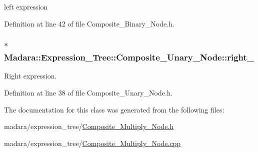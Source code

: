 left expression 



Definition at line 42 of file Composite\_\-Binary\_\-Node.h.

\hypertarget{classMadara_1_1Expression__Tree_1_1Composite__Unary__Node_a077b7bd1b52df6f5c6adfde735556a68}{
\subsubsection[{right\_\-}]{$\ast$ {\bf Madara::Expression\_\-Tree::Composite\_\-Unary\_\-Node::right\_\-}}}
\label{d3/dc7/classMadara_1_1Expression__Tree_1_1Composite__Unary__Node_a077b7bd1b52df6f5c6adfde735556a68}


Right expression. 



Definition at line 38 of file Composite\_\-Unary\_\-Node.h.



The documentation for this class was generated from the following files:\begin{DoxyCompactItemize}
\item 
madara/expression\_\-tree/\hyperlink{Composite__Multiply__Node_8h}{Composite\_\-Multiply\_\-Node.h}\item 
madara/expression\_\-tree/\hyperlink{Composite__Multiply__Node_8cpp}{Composite\_\-Multiply\_\-Node.cpp}\end{DoxyCompactItemize}
